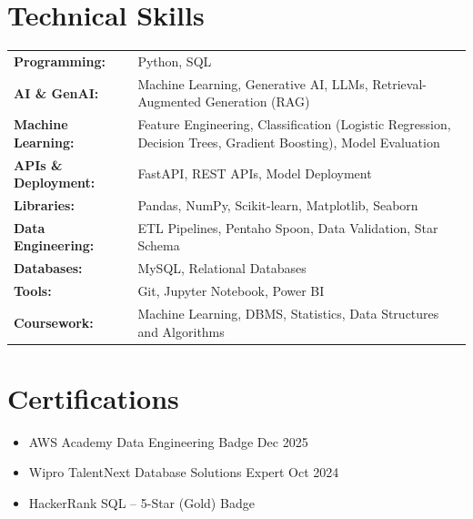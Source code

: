 \documentclass[a4paper,10pt]{article}
\begin{document}
\section{Technical Skills}
\begin{tabularx}{\linewidth}{@{}l X@{}}
\textbf{Programming:} & Python, SQL \\
\textbf{AI \& GenAI:} & Machine Learning, Generative AI, LLMs, Retrieval-Augmented Generation (RAG) \\
\textbf{Machine Learning:} & Feature Engineering, Classification (Logistic Regression, Decision Trees, Gradient Boosting), Model Evaluation \\
\textbf{APIs \& Deployment:} & FastAPI, REST APIs, Model Deployment \\
\textbf{Libraries:} & Pandas, NumPy, Scikit-learn, Matplotlib, Seaborn \\
\textbf{Data Engineering:} & ETL Pipelines, Pentaho Spoon, Data Validation, Star Schema \\
\textbf{Databases:} & MySQL, Relational Databases \\
\textbf{Tools:} & Git, Jupyter Notebook, Power BI \\
\textbf{Coursework:} & Machine Learning, DBMS, Statistics, Data Structures and Algorithms \\
\end{tabularx}

\section{Certifications}
\begin{itemize}[leftmargin=1em, itemsep=1pt, label=--, nosep]
    \item AWS Academy Data Engineering Badge \hfill Dec 2025
    \item Wipro TalentNext Database Solutions Expert \hfill Oct 2024
    \item HackerRank SQL -- 5-Star (Gold) Badge
\end{itemize}
\end{document}
